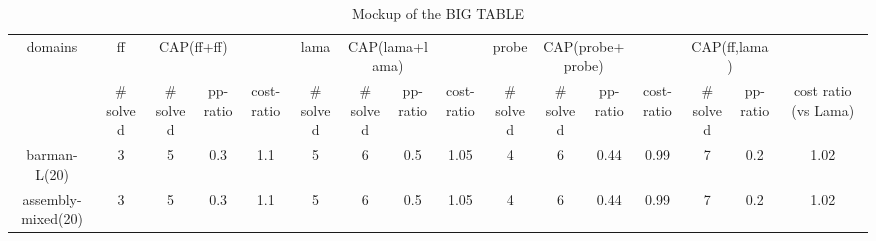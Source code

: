 

\begin{table*}[h]
\centering
 {
\begin{tabular}{c|c|cc|c||c|cc|c||c|cc|c||cc|c|}
\hline
domains & \multicolumn{1}{|c|}{ff} & \multicolumn{2}{|c|}{CAP(ff+ff)} &  & 
      \multicolumn{1}{|c|}{lama} & \multicolumn{2}{|c|}{CAP(lama+lama)} &  &
      \multicolumn{1}{|c|}{probe} & \multicolumn{2}{|c|}{CAP(probe+probe)} &  &
      \multicolumn{2}{|c|}{CAP(ff,lama)} & \\
        & \# solved  & \# solved &  pp-ratio  &   cost-ratio  &
        \# solved   & \# solved &  pp-ratio  &   cost-ratio  &
        \# solved   & \# solved &  pp-ratio  &   cost-ratio  &
        \# solved   & pp-ratio & cost ratio (vs Lama) \\
    
\hline
barman-L(20)  & 3  &  5 & 0.3 & 1.1 
              & 5  &  6 & 0.5 & 1.05 
              & 4  &  6 & 0.44 & 0.99 
              & 7  & 0.2 & 1.02\\

assembly-mixed(20) &3  &  5 & 0.3 & 1.1 
              & 5  &  6 & 0.5 & 1.05 
              & 4  &  6 & 0.44 & 0.99 
              & 7  & 0.2 & 1.02\\
\hline

\hline
\end{tabular}
} \caption{ Mockup of the BIG TABLE }
\end{table*}





\begin{table*}[h]
 \caption{ Mockup of the BIG TABLE }
\end{table*}
